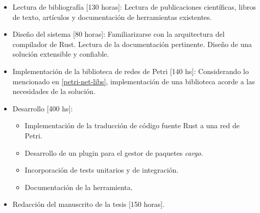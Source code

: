\documentclass[12pt]{article}
\begin{document}
\begin{itemize}
    \item Lectura de bibliografía [130 horas]: Lectura de publicaciones científicas, libros de texto, artículos y documentación de herramientas existentes.
    \item Diseño del sistema [80 horas]: Familiarizarse con la arquitectura del compilador de Rust. Lectura de la documentación pertinente. Diseño de una solución extensible y confiable.
    \item Implementación de la biblioteca de redes de Petri [140 hs]: Considerando lo mencionado en \ref{petri-net-libs}, implementación de una biblioteca acorde a las necesidades de la solución.
    \item Desarrollo [400 hs]:
          \begin{itemize}
              \item Implementación de la traducción de código fuente Rust a una red de Petri.
              \item Desarrollo de un plugin para el gestor de paquetes \textit{cargo}.
              \item Incorporación de tests unitarios y de integración.
              \item Documentación de la herramienta.
          \end{itemize}
    \item Redacción del manuscrito de la tesis [150 horas].
\end{itemize}

\bigskip



\end{document}
